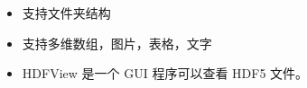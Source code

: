 

\begin{issues}
\issueDraft
\end{issues}

\begin{itemize}
\item 支持文件夹结构
\item 支持多维数组，图片，表格，文字
\item HDFView 是一个 GUI 程序可以查看 HDF5 文件。
\end{itemize}

